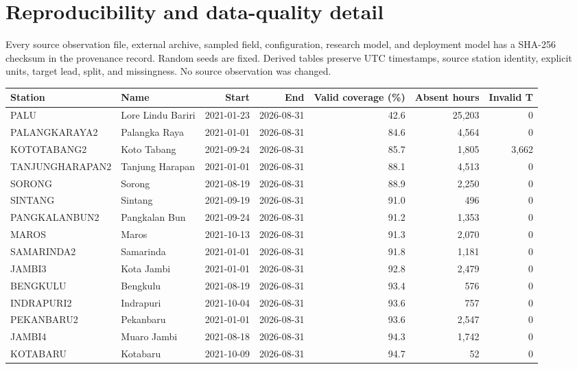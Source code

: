 \documentclass[11pt,a4paper]{article}
\begin{document}
\section{Reproducibility and data-quality detail}
Every source observation file, external archive, sampled field, configuration, research model, and deployment model has a SHA-256 checksum in the provenance record. Random seeds are fixed. Derived tables preserve UTC timestamps, source station identity, explicit units, target lead, split, and missingness. No source observation was changed.

\begin{landscape}
\begin{table}[H]
\centering
\small
\begin{adjustbox}{max width=\linewidth}
\begin{tabular}{llrrrrr}
\toprule
Station & Name & Start & End & Valid coverage (\%) & Absent hours & Invalid T \\
\midrule
PALU & Lore Lindu Bariri & 2021-01-23 & 2026-08-31 & 42.6 & 25,203 & 0 \\
PALANGKARAYA2 & Palangka Raya & 2021-01-01 & 2026-08-31 & 84.6 & 4,564 & 0 \\
KOTOTABANG2 & Koto Tabang & 2021-09-24 & 2026-08-31 & 85.7 & 1,805 & 3,662 \\
TANJUNGHARAPAN2 & Tanjung Harapan & 2021-01-01 & 2026-08-31 & 88.1 & 4,513 & 0 \\
SORONG & Sorong & 2021-08-19 & 2026-08-31 & 88.9 & 2,250 & 0 \\
SINTANG & Sintang & 2021-09-19 & 2026-08-31 & 91.0 & 496 & 0 \\
PANGKALANBUN2 & Pangkalan Bun & 2021-09-24 & 2026-08-31 & 91.2 & 1,353 & 0 \\
MAROS & Maros & 2021-10-13 & 2026-08-31 & 91.3 & 2,070 & 0 \\
SAMARINDA2 & Samarinda & 2021-01-01 & 2026-08-31 & 91.8 & 1,181 & 0 \\
JAMBI3 & Kota Jambi & 2021-01-01 & 2026-08-31 & 92.8 & 2,479 & 0 \\
BENGKULU & Bengkulu & 2021-08-19 & 2026-08-31 & 93.4 & 576 & 0 \\
INDRAPURI2 & Indrapuri & 2021-10-04 & 2026-08-31 & 93.6 & 757 & 0 \\
PEKANBARU2 & Pekanbaru & 2021-01-01 & 2026-08-31 & 93.6 & 2,547 & 0 \\
JAMBI4 & Muaro Jambi & 2021-08-18 & 2026-08-31 & 94.3 & 1,742 & 0 \\
KOTABARU & Kotabaru & 2021-10-09 & 2026-08-31 & 94.7 & 52 & 0 \\

\end{tabular}
\end{adjustbox}
\end{table}
\end{landscape}
\end{document}
